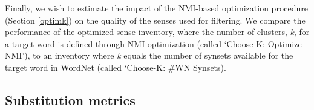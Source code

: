 \documentclass[11pt]{article}
\begin{document}
Finally, we wish to estimate the impact of the NMI-based  optimization procedure (Section \ref{optimk}) on the quality of the senses used for filtering. We compare the performance of the optimized sense inventory, where the number of clusters, \textit{k}, for a target word is defined through NMI optimization (called `Choose-K: Optimize NMI'), to  an inventory where \textit{k} equals the number of synsets available for the target word in WordNet (called `Choose-K: \#WN Synsets). 


\subsection{Substitution metrics}



\end{document}
